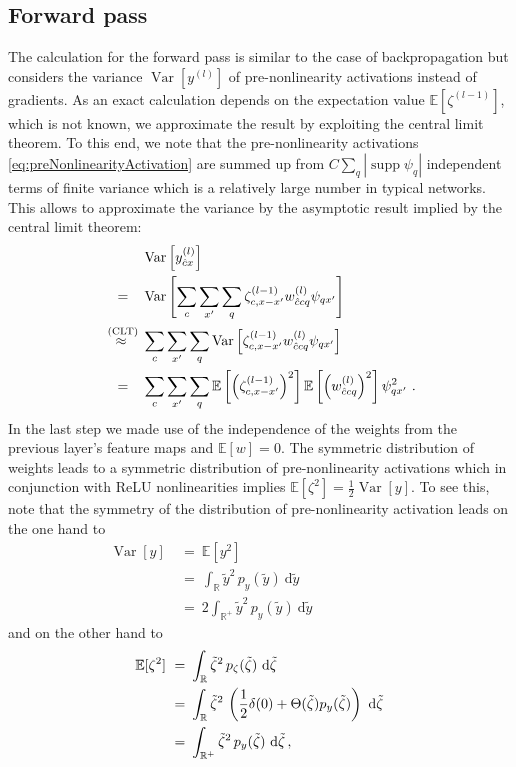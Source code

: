 \documentclass[10pt,twocolumn,letterpaper]{article}
\newcommand{\E}{\mathbb{E}}
\newcommand{\Var}{\operatorname{Var}}
\newcommand{\R}{\mathbb{R}}
\newcommand{\equalCLT}{\overset{\hphantom{\text{(CLT)}}}{=}}
\newcommand{\supp}{\operatorname{supp}}
\begin{document}
\subsection{Forward pass}
The calculation for the forward pass is similar to the case of backpropagation but considers the variance $\Var\left[y^{(l)}\right]$ of pre-nonlinearity activations instead of gradients.
As an exact calculation depends on the expectation value $\E\left[\zeta^{(l-1)}\right]$, which is not known, we approximate the result by exploiting the central limit theorem.
To this end, we note that the pre-nonlinearity activations \eqref{eq:preNonlinearityActivation} are summed up from \mbox{$C\sum_{q}|\supp{\psi_q}|$} independent terms of finite variance which is a relatively large number in typical networks.
This allows to approximate the variance by the asymptotic result implied by the central limit theorem:
\begin{align*}
	& \Var\left[y_{\hat{c}x}^{(l)}\right] \\
	\equalCLT\; & \Var\left[\sum\limits_{c}\sum\limits_{x'}\sum\limits_{q} \zeta_{c,x-x'}^{(l-1)} w_{\hat{c}cq}^{(l)}\psi_{qx'}\right]\\
	\stackrel{\text{ (CLT)} }{\approx}\; & \sum\limits_{c}\sum\limits_{x'}\sum\limits_{q} \Var\left[\zeta_{c,x-x'}^{(l-1)} w_{\hat{c}cq}^{(l)}\psi_{qx'}\right]\\
	\equalCLT\; & \sum\limits_{c}\sum\limits_{x'}\sum\limits_{q}\E\left[\left(\zeta_{c,x-x'}^{(l-1)}\right)^2\right]\E\left[\left(w_{\hat{c}cq}^{(l)}\right)^2\right]\psi_{qx'}^2\ .
\end{align*}
In the last step we made use of the independence of the weights from the previous layer's feature maps and \mbox{$\E[w]=0.$}
The symmetric distribution of weights leads to a symmetric distribution of pre-nonlinearity activations which in conjunction with ReLU nonlinearities implies \mbox{$\E[\zeta^2]=\frac{1}{2}\Var[y]$.}
To see this, note that the symmetry of the distribution of pre-nonlinearity activation leads on the one hand to
\begin{equation*}
\begin{split}
	\Var[y] \ &=\ \E[y^2]\\
	&=\ \int_\R \tilde{y}^2\, p_y(\tilde{y})\ \mathrm{d}\tilde{y}\\
	&=\ 2\int_{\R^+} \tilde{y}^2\, p_y(\tilde{y})\ \mathrm{d}\tilde{y}	\qquad\qquad\qquad\quad
\end{split}
\end{equation*}
and on the other hand to
\begin{align}
	\E[\zeta^2]
	\ =&\ \int_\R \tilde{\zeta}^2\, p_\zeta(\tilde{\zeta})\ \mathrm{d}\tilde{\zeta}\notag\\
	\ =&\ \int_\R \tilde{\zeta}^2\, \left(\frac{1}{2}\delta(0) + \Theta(\tilde{\zeta})p_y(\tilde{\zeta})\right)\ \mathrm{d}\tilde{\zeta}\notag\\
	\ =&\ \int_{\R^+} \tilde{\zeta}^2\, p_y(\tilde{\zeta})\ \mathrm{d}\tilde{\zeta}\,,\ \notag
\end{align}
\end{document}
